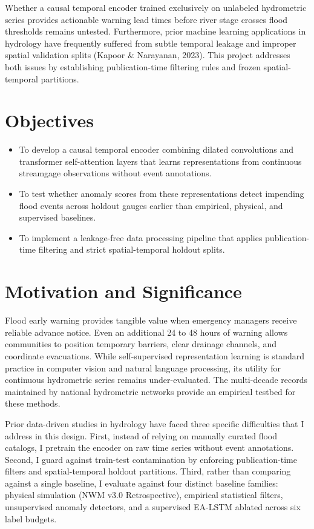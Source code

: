 \documentclass[12pt]{report}
\begin{document}
Whether a causal temporal encoder trained exclusively on unlabeled hydrometric series provides actionable warning lead times before river stage crosses flood thresholds remains untested. Furthermore, prior machine learning applications in hydrology have frequently suffered from subtle temporal leakage and improper spatial validation splits (Kapoor \& Narayanan, 2023). This project addresses both issues by establishing publication-time filtering rules and frozen spatial-temporal partitions.

\section{Objectives}

\begin{itemize}
  \item To develop a causal temporal encoder combining dilated convolutions and transformer self-attention layers that learns representations from continuous streamgage observations without event annotations.
  \item To test whether anomaly scores from these representations detect impending flood events across holdout gauges earlier than empirical, physical, and supervised baselines.
  \item To implement a leakage-free data processing pipeline that applies publication-time filtering and strict spatial-temporal holdout splits.
\end{itemize}

\section{Motivation and Significance}

Flood early warning provides tangible value when emergency managers receive reliable advance notice. Even an additional 24 to 48 hours of warning allows communities to position temporary barriers, clear drainage channels, and coordinate evacuations. While self-supervised representation learning is standard practice in computer vision and natural language processing, its utility for continuous hydrometric series remains under-evaluated. The multi-decade records maintained by national hydrometric networks provide an empirical testbed for these methods.

Prior data-driven studies in hydrology have faced three specific difficulties that I address in this design. First, instead of relying on manually curated flood catalogs, I pretrain the encoder on raw time series without event annotations. Second, I guard against train-test contamination by enforcing publication-time filters and spatial-temporal holdout partitions. Third, rather than comparing against a single baseline, I evaluate against four distinct baseline families: physical simulation (NWM v3.0 Retrospective), empirical statistical filters, unsupervised anomaly detectors, and a supervised EA-LSTM ablated across six label budgets.
\end{document}
